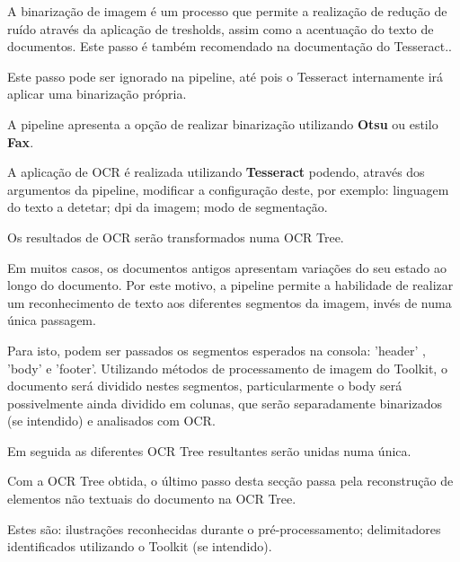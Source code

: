 

A binarização de imagem é um processo que permite a realização de redução de ruído através da aplicação de tresholds, assim como a acentuação do texto de documentos. Este passo é também recomendado na documentação do Tesseract..

Este passo pode ser ignorado na pipeline, até pois o Tesseract internamente irá aplicar uma binarização própria.

A pipeline apresenta a opção de realizar binarização utilizando \textbf{Otsu} ou estilo \textbf{Fax}.





A aplicação de OCR é realizada utilizando \textbf{Tesseract} podendo, através dos argumentos da pipeline, modificar a configuração deste, por exemplo: linguagem do texto a detetar; dpi da imagem; modo de segmentação.

Os resultados de OCR serão transformados numa OCR Tree.



Em muitos casos, os documentos antigos apresentam variações do seu estado ao longo do documento. Por este motivo, a pipeline permite a habilidade de realizar um reconhecimento de texto aos diferentes segmentos da imagem, invés de numa única passagem. 

Para isto, podem ser passados os segmentos esperados na consola: 'header' , 'body' e 'footer'. Utilizando métodos de processamento de imagem do Toolkit, o documento será dividido nestes segmentos, particularmente o body será possivelmente ainda dividido em colunas, que serão separadamente binarizados (se intendido) e analisados com OCR.

Em seguida as diferentes OCR Tree resultantes serão unidas numa única.




Com a OCR Tree obtida, o último passo desta secção passa pela reconstrução de elementos não textuais do documento na OCR Tree. 

Estes são: ilustrações reconhecidas durante o pré-processamento; delimitadores identificados utilizando o Toolkit (se intendido).

